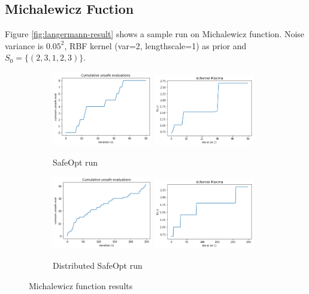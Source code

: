 \newpage
\subsection{Michalewicz Fuction}
Figure \ref{fig:langermann-result} shows a sample run on Michalewicz function. Noise variance is $0.05^2$, RBF kernel (var=2, lengthscale=1) as prior and $S_0=\{ (2, 3, 1, 2, 3) \}$.
\begin{figure}[h!]
	\centering
	\begin{subfigure}{0.99\textwidth}
		\includegraphics[width=0.48\textwidth]{figures/results/michalewicz-sbo-cum-unsafe.png}
		\includegraphics[width=0.48\textwidth]{figures/results/michalewicz-sbo-maxima.png}
		\caption{SafeOpt run}
		\label{fig:michalewicz-result-sbo}
	\end{subfigure}
	\vfill
	\begin{subfigure}{0.98\textwidth}
		\includegraphics[width=0.48\textwidth]{figures/results/michalewicz-dbo-cum-unsafe.png}
		\includegraphics[width=0.48\textwidth]{figures/results/michalewicz-dbo-maxima.png}
		\caption{Distributed SafeOpt run}
		\label{fig:michalewicz-result-dbo}
	\end{subfigure}
	\caption{Michalewicz function results}
	\label{fig:michalewicz-result}
\end{figure}